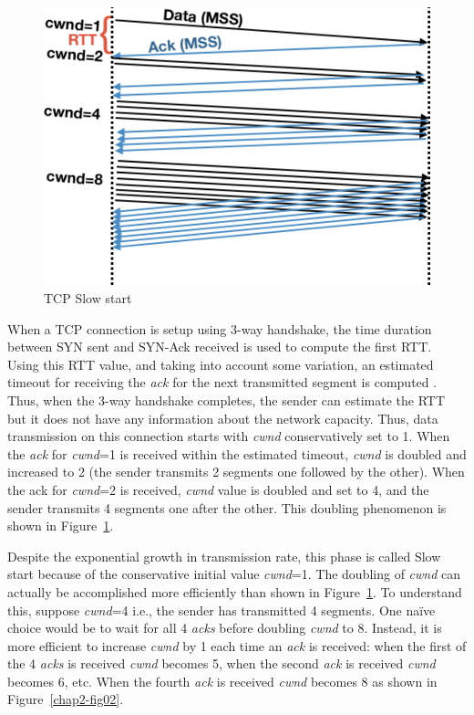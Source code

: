 \begin{multicols}{2}
\setcounter{figure}{0}
\begin{figure}[H]
\centering
\includegraphics[scale=2.1]{src/Figures/chap2/chap2-fig01.jpg}
\caption{TCP Slow start}\label{chap2-fig01}
\end{figure}

When a TCP connection is setup using 3-way handshake, the time duration between SYN sent and SYN-Ack received is used to compute the first RTT. Using this RTT value, and taking into account some variation, an estimated timeout for receiving the \textit{ack} for the next transmitted segment is computed  \cite{art2-key03}. Thus, when the 3-way handshake completes, the sender can estimate the RTT but it does not have any information about the network capacity. Thus, data transmission on this connection starts with \textit{cwnd} conservatively set to 1. When the \textit{ack} for \textit{cwnd}=1 is received within the estimated timeout, \textit{cwnd} is doubled and increased to 2 (the sender transmits 2 segments one followed by the other). When the ack for \textit{cwnd}=2 is received, \textit{cwnd} value is doubled and set to 4, and the sender transmits 4 segments one after the other. This doubling phenomenon is shown in Figure~\ref{chap2-fig01}.

Despite the exponential growth in transmission rate, this phase is called Slow start because of the conservative initial value \textit{cwnd}=1. The doubling of \textit{cwnd} can actually be accomplished more efficiently than shown in Figure~\ref{chap2-fig01}. To understand this, suppose \textit{cwnd}=4 i.e., the sender has transmitted 4 segments. One naïve choice would be to wait for all 4 \textit{acks} before doubling \textit{cwnd} to 8. Instead, it is more efficient to increase \textit{cwnd} by 1 each time an \textit{ack} is received: when the first of the 4 \textit{acks} is received \textit{cwnd} becomes 5, when the second \textit{ack} is received \textit{cwnd} becomes 6, etc. When the fourth \textit{ack} is received \textit{cwnd} becomes 8 as shown in Figure~\ref{chap2-fig02}.


\end{multicols}
